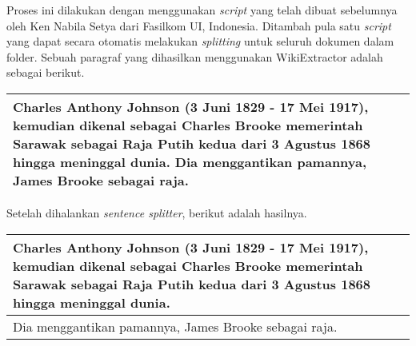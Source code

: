 Proses ini dilakukan dengan menggunakan \textit{script} yang telah dibuat sebelumnya oleh Ken Nabila Setya dari Fasilkom UI, Indonesia. Ditambah pula satu \textit{script} yang dapat secara otomatis melakukan \textit{splitting} untuk seluruh dokumen dalam folder. Sebuah paragraf yang dihasilkan menggunakan WikiExtractor adalah sebagai berikut.
\begin{center}
\begin{tabular}{ | m{32em} | } 
\hline
Charles Anthony Johnson (3 Juni 1829 - 17 Mei 1917), kemudian dikenal sebagai Charles Brooke memerintah Sarawak sebagai Raja Putih kedua dari 3 Agustus 1868 hingga meninggal dunia. Dia menggantikan pamannya, James Brooke sebagai raja. \\
\hline 
\end{tabular}
\end{center}

Setelah dihalankan \textit{sentence splitter}, berikut adalah hasilnya.
\begin{center}
\begin{tabular}{ | m{32em} | } 
\hline
Charles Anthony Johnson (3 Juni 1829 - 17 Mei 1917), kemudian dikenal sebagai Charles Brooke memerintah Sarawak sebagai Raja Putih kedua dari 3 Agustus 1868 hingga meninggal dunia. \\
\hline 
 Dia menggantikan pamannya, James Brooke sebagai raja. \\
\hline
\end{tabular}
\end{center}

